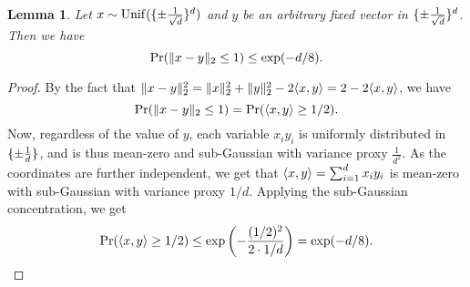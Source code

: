 \documentclass[11pt]{article}
\DeclarePairedDelimiter\set{\{}{\}}
\newtheorem{lemma}{Lemma}
\begin{document}
\begin{lemma}
  \label{lemma:widespread}
  Let $x\sim{\rm Unif}(\set{\pm \frac{1}{\sqrt{d}}}^d)$ and $y$ be an arbitrary fixed vector in $\set{\pm \frac{1}{\sqrt{d}}}^d$. Then we have
  \begin{equation*}
    {\rm Pr}(\|x-y\|_2 \le 1) \le \exp(-d/8).
  \end{equation*}
\end{lemma}
\begin{proof}
  By the fact that $\|x-y\|_2^2=\|x\|_2^2+\|y\|_2^2-2\langle x, y\rangle=2-2\langle x, y\rangle$, we have
  \begin{equation*}
    {\rm Pr}(\|x-y\|_2 \le 1) = {\rm Pr}(\langle x, y\rangle \ge 1/2).
  \end{equation*}
  Now, regardless of the value of $y$, each variable $x_iy_i$ is uniformly distributed in $\set{\pm \frac{1}{d}}$, and is thus mean-zero and sub-Gaussian with variance proxy $\frac{1}{d^2}$. As the coordinates are further independent, we get that $\langle x,y\rangle = \sum_{i=1}^d x_iy_i$ is mean-zero with sub-Gaussian with variance proxy $1/d$. Applying the sub-Gaussian concentration, we get
  \begin{equation*}
    {\rm Pr}(\langle x, y\rangle \ge 1/2) \le \exp\left( -\frac{(1/2)^2}{2\cdot 1/d} \right) = \exp(-d/8).
  \end{equation*}
\end{proof}
\end{document}
